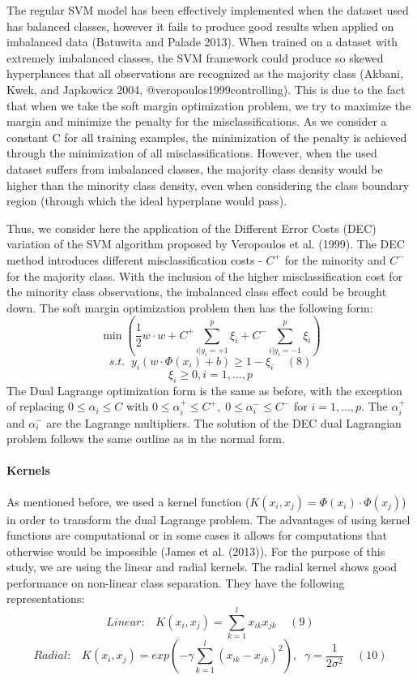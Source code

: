 \documentclass[12pt,]{article}
\let\oldparagraph\paragraph
\renewcommand{\paragraph}[1]{\oldparagraph{#1}\mbox{}}
\begin{document}
The regular SVM model has been effectively implemented when the dataset
used has balanced classes, however it fails to produce good results when
applied on imbalanced data (Batuwita and Palade 2013). When trained on a
dataset with extremely imbalanced classes, the SVM framework could
produce so skewed hyperplances that all observations are recognized as
the majority class (Akbani, Kwek, and Japkowicz 2004,
@veropoulos1999controlling). This is due to the fact that when we take
the soft margin optimization problem, we try to maximize the margin and
minimize the penalty for the misclassifications. As we consider a
constant C for all training examples, the minimization of the penalty is
achieved through the minimization of all misclassifications. However,
when the used dataset suffers from imbalanced classes, the majority
class density would be higher than the minority class density, even when
considering the class boundary region (through which the ideal
hyperplane would pass).

Thus, we consider here the application of the Different Error Costs
(DEC) variation of the SVM algorithm proposed by Veropoulos et al.
(1999). The DEC method introduces different misclassification costs -
\(C^+\) for the minority and \(C^-\) for the majority class. With the
inclusion of the higher misclassification cost for the minority class
observations, the imbalanced class effect could be brought down. The
soft margin optimization problem then has the following form:
\[\min{(\frac{1}{2}w \cdot w + C^+\sum_{i|y_i=+1}^{p}\xi_i + C^-\sum_{i|y_i=-1}^{p}\xi_i)}\]
\[s.t. \;\; y_i(w \cdot \Phi(x_i) + b) \geq 1 - \xi_i\;\;\;\;(8)\]
\[\xi_i \geq 0, i = 1,...,p\] The Dual Lagrange optimization form is the
same as before, with the exception of replacing \(0 \leq\alpha_i\leq C\)
with \(0 \leq\alpha_i^+\leq C^+, \; 0 \leq\alpha_i^-\leq C^-\) for
\(i=1,...,p\). The \(\alpha_i^+\) and \(\alpha_i^-\) are the Lagrange
multipliers. The solution of the DEC dual Lagrangian problem follows the
same outline as in the normal form.

\hypertarget{kernels}{%
\paragraph{Kernels}\label{kernels}}

As mentioned before, we used a kernel function
(\(K(x_i,x_j) = \Phi(x_i)\cdot \Phi(x_j)\)) in order to transform the
dual Lagrange problem. The advantages of using kernel functions are
computational or in some cases it allows for computations that otherwise
would be impossible (James et al. (2013)). For the purpose of this
study, we are using the linear and radial kernels. The radial kernel
shows good performance on non-linear class separation. They have the
following representations:
\[Linear: \;\;\; K(x_i,x_j) = \sum_{k=1}^{l}x_{ik}x_{jk}\;\;\;\;(9)\]
\[Radial: \;\;\; K(x_i,x_j) = exp(-\gamma\sum_{k=1}^{l}(x_{ik}-x_{jk})^2), \;\; \gamma=\frac{1}{2\sigma^2}\;\;\;\;(10)\]
\end{document}
